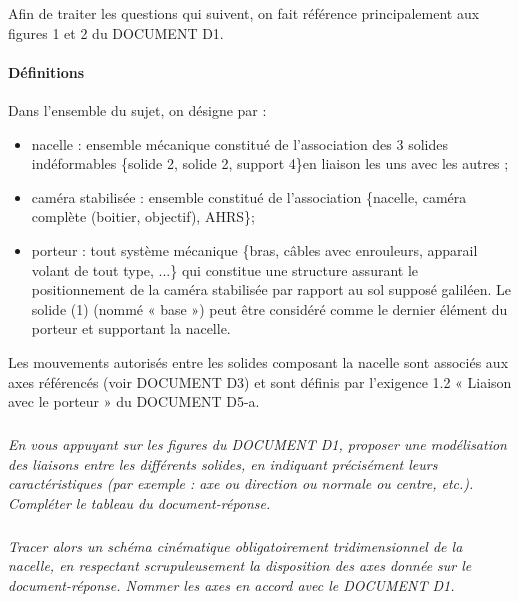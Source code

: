 \documentclass[10pt,fleqn]{article} %
\begin{document}
Afin de traiter les questions qui suivent, on fait référence principalement aux figures 1 et 2 du DOCUMENT D1.
\paragraph*{Définitions}
Dans l'ensemble du sujet, on désigne par :
\begin{itemize}
\item nacelle : ensemble mécanique constitué de l'association des 3 solides indéformables \{solide 2, solide 2, support 4\}en liaison les uns avec les autres ;
\item caméra stabilisée : ensemble constitué de l'association  \{nacelle, caméra complète (boitier, objectif), AHRS\};
\item porteur : tout système mécanique \{bras, câbles avec enrouleurs, apparail volant de tout type, ...\} qui constitue une structure assurant le positionnement de la caméra stabilisée par rapport au sol supposé galiléen. Le solide (1) (nommé « base ») peut être considéré comme le dernier élément du porteur et supportant la nacelle.
\end{itemize}

Les mouvements autorisés entre les solides composant la nacelle sont associés aux axes référencés (voir DOCUMENT D3) et sont définis par l’exigence 1.2 « Liaison avec le porteur » du DOCUMENT D5-a.

\subparagraph{\label{q8}}\textit{En vous appuyant sur les figures du DOCUMENT D1, proposer une modélisation des liaisons entre les différents solides, en indiquant précisément leurs caractéristiques (par exemple : axe ou direction ou normale ou centre, etc.). Compléter le tableau du document-réponse.}

\subparagraph{\label{q9}}\textit{Tracer alors un schéma cinématique obligatoirement tridimensionnel de la nacelle, en respectant scrupuleusement la disposition des axes donnée sur le document-réponse. Nommer les axes en accord avec le DOCUMENT D1.}

%
%
\end{document}
